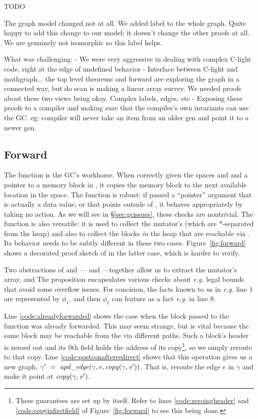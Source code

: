 \hide
{\color{red} TODO

The graph model changed not at all. We added label to the whole graph. Quite happy to add this change to our model; it doesn't change the other proofs at all. We are genuinely not isomorphic so this label helps.

What was challenging:
	- We were very aggressive in dealing with complex C-light code, right at the edge of undefined behavior
	- Interface between C-light and mathgraph... the top level theorems and forward are exploring the graph in a connected way, but do scan is making a linear array survey. We needed proofs about these two views being okay. Complex labels, edges, etc
	- Exposing these proofs to a compiler and making sure that the compiler's own invariants can use the GC. eg: compiler will never take an item from an older gen and point it to a newer gen.
}

\subsection{Forward}
\label{sec:gcforward}
The function  is the GC's workhorse.
When correctly given the spaces  and  and a pointer
 to a memory block in ,
it copies the memory block to the next
available location in the  space.
The function is robust: if passed a ``pointer'' argument
that is actually a data value, or that points outside of
, it behaves appropriately by taking no action.
As we will see in \S\ref{sec:gcissues}, these checks are nontrivial.
The function is also versatile: it is used to collect the
mutator's  (which are $*$-separated from the heap)
and also to collect the blocks \emph{in} the heap that are reachable via
. Its behavior needs to be subtly different in these
two cases.
Figure~\ref{fig:forward} shows a decorated proof sketch of 
in the latter case, which is harder to verify.

Two abstractions of  
and --- and ---together allow us to
extract the mutator's  array, and The
proposition  encapsulates various checks
about \emph{e.g.} legal bounds that avoid some overflow issues.  For
concision, the facts known to us in
\emph{e.g.} line $1$ are represented by $\phi_1$, and then $\phi_1$
can feature as a fact \emph{e.g.} in line $8$.

Line \ref{code:alreadyforwarded} shows
the case when the block passed to the function was already forwarded.
This may seem strange, but is vital because the same block may be
reachable from the  via different paths.
Such a block's header is zeroed out and its $0$th field holds
the address of its
copy\footnote{These guarantees are set up by  itself.
Refer to lines \ref{code:zeroingheader} and
\ref{code:copyinfirstfield} of Figure~\ref{fig:forward} to see this being done.},
so we simply reroute to that copy.
Line \ref{code:postconafterredirect} shows that this operation
gives us a new graph, $\gamma'~=~\mathit{upd\_edge}(\gamma, \mathit{e}, \mathit{copy}(\gamma, \mathit{v'}))$.
That is, reroute the edge $e$ in $\gamma$ and make it point at
$\mathit{copy}(\gamma, \mathit{v'})$.

